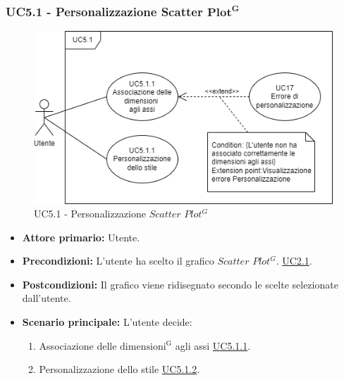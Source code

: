 \subsubsection{UC5.1 - Personalizzazione Scatter ${\mathbf{Plot^{G}}}$}
\label{sec:UC5.1}
\begin{figure}[h!]
	\centering
	\includegraphics[scale=0.60]{../../assets/personalizzazioneScatterPlot.png}
	\caption{UC5.1 - Personalizzazione $Scatter$ $Plot^{G}$}
\end{figure}
\begin{itemize}
    \item \textbf{Attore primario:} Utente.
	\item \textbf{Precondizioni:} L'utente ha scelto il grafico $Scatter$ $Plot^{G}$. \hyperref[sec:UC2.1]{UC2.1}.
	\item \textbf{Postcondizioni:} 
	Il grafico viene ridisegnato secondo le scelte selezionate dall'utente.
	\item \textbf{Scenario principale:} L'utente decide:
	\begin{enumerate}
        \item Associazione delle ${\mathrm{dimensioni^{G}}}$ agli assi \hyperref[sec:UC5.1.1]{UC5.1.1}.
        \item Personalizzazione dello stile \hyperref[sec:UC5.1.2]{UC5.1.2}.
    \end{enumerate}
\end{itemize}
